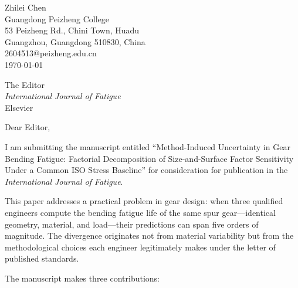\documentclass[12pt,a4paper]{article}
\begin{document}
\begin{flushright}
Zhilei Chen\\
Guangdong Peizheng College\\
53 Peizheng Rd., Chini Town, Huadu\\
Guangzhou, Guangdong 510830, China\\
2604513@peizheng.edu.cn\\
\today
\end{flushright}

\vspace{1cm}

\noindent
The Editor\\
\textit{International Journal of Fatigue}\\
Elsevier

\vspace{0.5cm}

\noindent Dear Editor,

\medskip

\noindent I am submitting the manuscript entitled ``Method-Induced
Uncertainty in Gear Bending Fatigue: Factorial Decomposition of
Size-and-Surface Factor Sensitivity Under a Common ISO Stress
Baseline'' for consideration for publication in the
\textit{International Journal of Fatigue}.

This paper addresses a practical problem in gear design: when three
qualified engineers compute the bending fatigue life of the same spur
gear---identical geometry, material, and load---their predictions can
span five orders of magnitude. The divergence originates not from
material variability but from the methodological choices each engineer
legitimately makes under the letter of published standards.

The manuscript makes three contributions:
\end{document}
